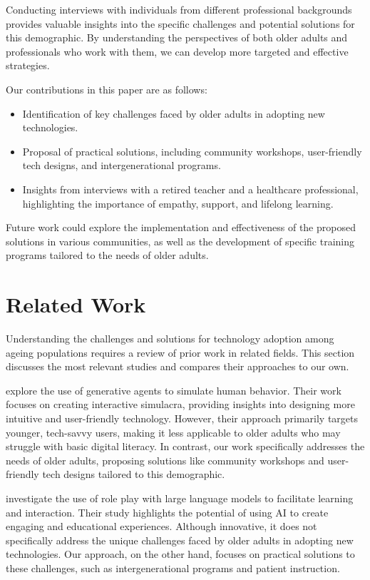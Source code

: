 \documentclass{article} %
\begin{document}
Conducting interviews with individuals from different professional backgrounds provides valuable insights into the specific challenges and potential solutions for this demographic. By understanding the perspectives of both older adults and professionals who work with them, we can develop more targeted and effective strategies.

Our contributions in this paper are as follows:
\begin{itemize}
    \item Identification of key challenges faced by older adults in adopting new technologies.
    \item Proposal of practical solutions, including community workshops, user-friendly tech designs, and intergenerational programs.
    \item Insights from interviews with a retired teacher and a healthcare professional, highlighting the importance of empathy, support, and lifelong learning.
\end{itemize}

Future work could explore the implementation and effectiveness of the proposed solutions in various communities, as well as the development of specific training programs tailored to the needs of older adults.

\section{Related Work}
\label{sec:related}

Understanding the challenges and solutions for technology adoption among ageing populations requires a review of prior work in related fields. This section discusses the most relevant studies and compares their approaches to our own.

\citet{park2023generative} explore the use of generative agents to simulate human behavior. Their work focuses on creating interactive simulacra, providing insights into designing more intuitive and user-friendly technology. However, their approach primarily targets younger, tech-savvy users, making it less applicable to older adults who may struggle with basic digital literacy. In contrast, our work specifically addresses the needs of older adults, proposing solutions like community workshops and user-friendly tech designs tailored to this demographic.

\citet{shanahan2023role} investigate the use of role play with large language models to facilitate learning and interaction. Their study highlights the potential of using AI to create engaging and educational experiences. Although innovative, it does not specifically address the unique challenges faced by older adults in adopting new technologies. Our approach, on the other hand, focuses on practical solutions to these challenges, such as intergenerational programs and patient instruction.
\end{document}
